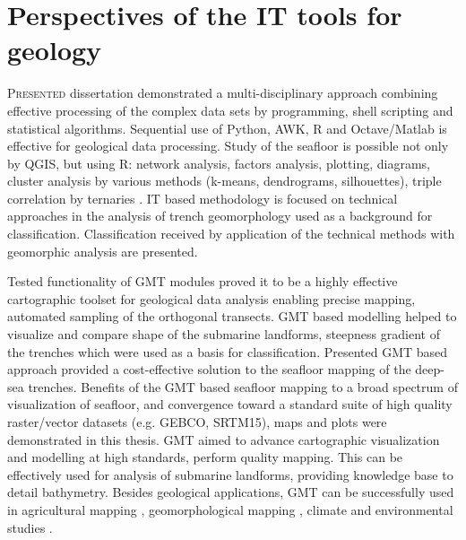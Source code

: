 \documentclass[11pt,a4paper]{report}
\begin{document}
{\section{Perspectives of the IT tools for geology}
\lettrine[lines=3]{\color{Firebrick4}P}{resented} dissertation demonstrated a multi-disciplinary approach combining effective processing of the complex data sets by programming, shell scripting and statistical algorithms. Sequential use of Python, AWK, R and Octave/Matlab is effective for geological data processing. Study of the seafloor is possible not only by \ac{QGIS}, but using R: network analysis, factors analysis, plotting, diagrams, cluster analysis by various methods (k-means, dendrograms, silhouettes), triple correlation by ternaries \cite{Lemenkova201999}. \ac{IT} based methodology is focused on technical approaches in the analysis of trench geomorphology used as a background for classification. Classification received by application of the technical methods with geomorphic analysis are presented. 

Tested functionality of \ac{GMT} modules proved it to be a highly effective cartographic toolset for geological data analysis enabling precise mapping, automated sampling of the orthogonal transects. \ac{GMT} based modelling helped to visualize and compare shape of the submarine landforms, steepness gradient of the trenches which were used as a basis for classification. Presented \ac{GMT} based approach provided a cost-effective solution to the seafloor mapping of the deep-sea trenches. Benefits of the \ac{GMT} based seafloor mapping to a broad spectrum of visualization of seafloor, and convergence toward a standard suite of high quality raster/vector datasets (e.g. \ac{GEBCO}, \ac{SRTM}15), maps and plots were demonstrated in this thesis. \ac{GMT} aimed to advance cartographic visualization and modelling at high standards, perform quality mapping. This can be effectively used for analysis of submarine landforms, providing knowledge base to detail bathymetry. Besides geological applications, GMT can be successfully used in agricultural mapping \cite{Lemenkova202113}, geomorphological mapping \cite{Lemenkova202111}, climate and environmental studies \cite{Lemenkova202108}.

}
\end{document}
